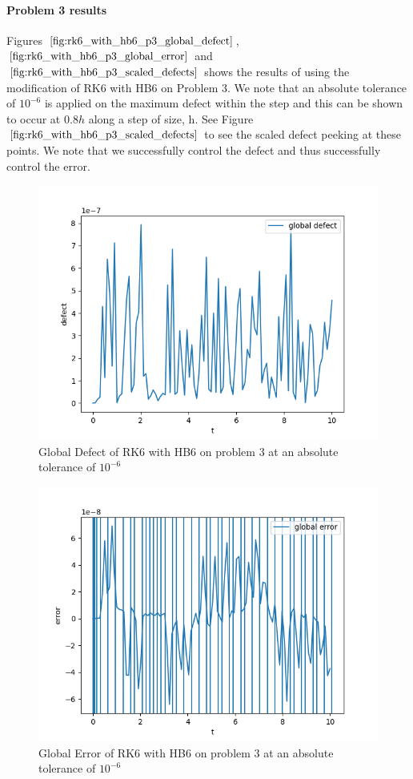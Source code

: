\documentclass{article}
\begin{document}
\paragraph{Problem 3 results}
Figures $\ref{fig:rk6_with_hb6_p3_global_defect}$, $\ref{fig:rk6_with_hb6_p3_global_error}$ and $\ref{fig:rk6_with_hb6_p3_scaled_defects}$ shows the results of using the modification of RK6 with HB6 on Problem 3. 
We note that an absolute tolerance of $10^{-6}$ is applied on the maximum defect within the step and this can be shown to occur at $0.8h$ along a step of size, h. See Figure $\ref{fig:rk6_with_hb6_p3_scaled_defects}$ to see the scaled defect peeking at these points. We note that we successfully control the defect and thus successfully control the error.

\begin{figure}[H]
\centering
\includegraphics[width=0.7\linewidth]{./figures/rk6_with_hb6_p3_global_defect}
\caption{Global Defect of RK6 with HB6 on problem 3 at an absolute tolerance of $10^{-6}$}
\label{fig:rk6_with_hb6_p3_global_defect}
\end{figure}

\begin{figure}[H]
\centering
\includegraphics[width=0.7\linewidth]{./figures/rk6_with_hb6_p3_global_error}
\caption{Global Error of RK6 with HB6 on problem 3 at an absolute tolerance of $10^{-6}$}
\label{fig:rk6_with_hb6_p3_global_error}
\end{figure}
\end{document}
